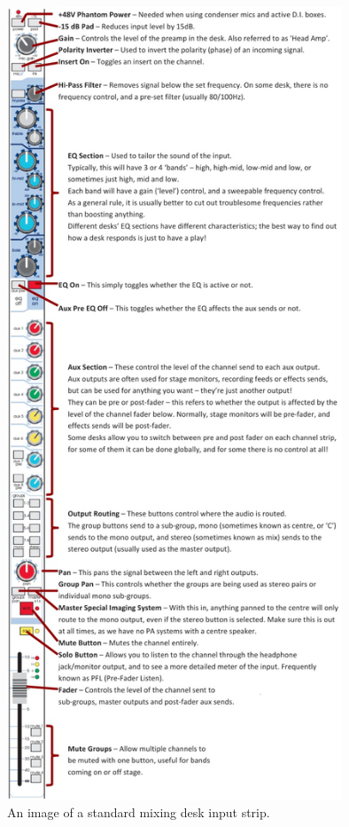\documentclass[14pt,twocolumn]{extarticle} %
\begin{document}
\begin{figure}[H]
\begin{center}

\includegraphics[width=10cm]{channel-strip.jpg}
\caption{An image of a standard mixing desk input strip.}
\label{fig:channel-strip}

\end{center}
\end{figure}
\end{document}
